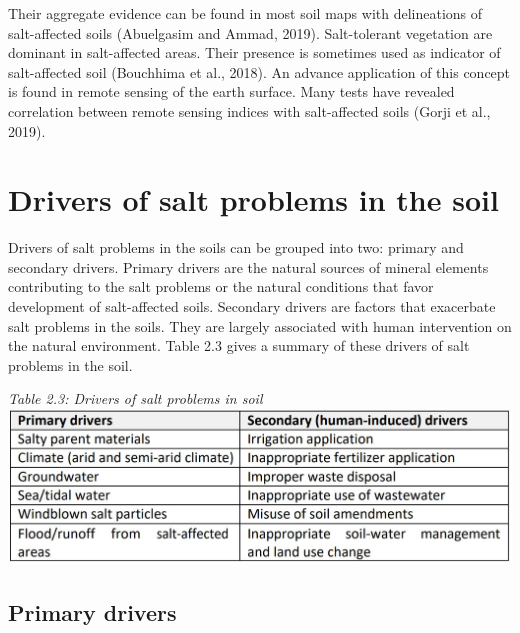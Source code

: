 \documentclass[
  10pt,
  b5paper,
]{book}
\begin{document}
Their aggregate evidence can be found in most soil maps with delineations of salt-affected soils (Abuelgasim and Ammad, 2019). Salt-tolerant vegetation are dominant in salt-affected areas. Their presence is sometimes used as indicator of salt-affected soil (Bouchhima et al., 2018). An advance application of this concept is found in remote sensing of the earth surface. Many tests have revealed correlation between remote sensing indices with salt-affected soils (Gorji et al., 2019).

\hypertarget{drivers-of-salt-problems-in-the-soil}{%
\section{Drivers of salt problems in the soil}\label{drivers-of-salt-problems-in-the-soil}}

Drivers of salt problems in the soils can be grouped into two: primary and secondary drivers. Primary drivers are the natural sources of mineral elements contributing to the salt problems or the natural conditions that favor development of salt-affected soils. Secondary drivers are factors that exacerbate salt problems in the soils. They are largely associated with human intervention on the natural environment. Table 2.3 gives a summary of these drivers of salt problems in the soil.

\emph{Table 2.3: Drivers of salt problems in soil}
\includegraphics{figures/tables/Table_2.3.jpg}

\hypertarget{primary-drivers}{%
\subsection{Primary drivers}\label{primary-drivers}}
\end{document}
